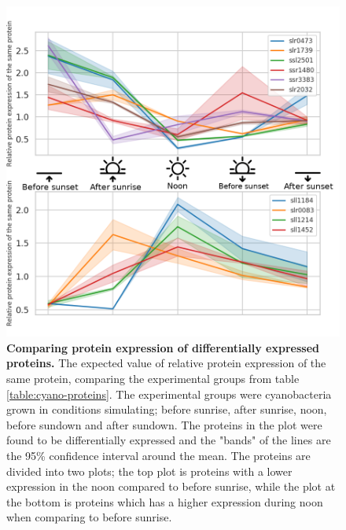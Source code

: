 \begin{figure}[H]
  \begin{center}
  \includegraphics[width=\linewidth]{results/combined_edited.png}
  \caption{\textbf{Comparing protein expression of differentially expressed proteins.} The expected value of relative protein expression of the same protein, comparing the experimental groups from table \ref{table:cyano-proteins}. The experimental groups were cyanobacteria grown in conditions simulating; before sunrise, after sunrise, noon, before sundown and after sundown. The proteins in the plot were found to be differentially expressed and the "bands" of the lines are the 95\% confidence interval around the mean. The proteins are divided into two plots; the top plot is proteins with a lower expression in the noon compared to before sunrise, while the plot at the bottom is proteins which has a higher expression during noon when comparing to before sunrise.}
  \label{fig:expression}
  \end{center}
\end{figure}
